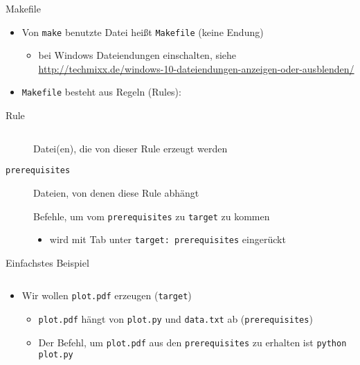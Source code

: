 \begin{frame}[fragile]{Makefile}
  \begin{itemize}
    \item Von \texttt{make} benutzte Datei heißt \texttt{Makefile} (keine Endung)
      \begin{itemize}
        \item bei Windows Dateiendungen einschalten, siehe
          \url{http://techmixx.de/windows-10-dateiendungen-anzeigen-oder-ausblenden/}
      \end{itemize}
    \item \texttt{Makefile} besteht aus Regeln (Rules):
  \end{itemize}
  \begin{block}{Rule}
    \inputminted{make}{example-files/Basic-block}
  \end{block}
  \begin{description}
    \item[\texttt{\hphantom{prerequisites}}] Datei(en), die von dieser Rule erzeugt werden
    \item[\texttt{prerequisites}]                         Dateien, von denen diese Rule abhängt
    \item[\texttt{\hphantom{prerequisites}}] Befehle, um vom \texttt{prerequisites} zu \texttt{target} zu kommen
    \begin{itemize}
      \item wird mit Tab unter \texttt{target: prerequisites} eingerückt
    \end{itemize}
  \end{description}
\end{frame}

\begin{frame}[fragile]{Einfachstes Beispiel}
  \begin{center}
    \inputminted{make}{example-files/Basic-block-example}
  \end{center}
  \begin{itemize}
    \item Wir wollen \texttt{plot.pdf} erzeugen (\texttt{target})
    \begin{itemize}
      \item \texttt{plot.pdf} hängt von \texttt{plot.py} und \texttt{data.txt} ab (\texttt{prerequisites})
      \item Der Befehl, um \texttt{plot.pdf} aus den \texttt{prerequisites} zu erhalten ist \texttt{python plot.py}
    \end{itemize}
  \end{itemize}
\end{frame}

